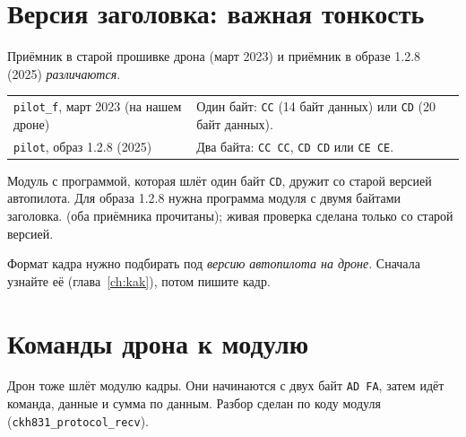 \section{Версия заголовка: важная тонкость}

Приёмник в старой прошивке дрона (март 2023) и приёмник в образе 1.2.8 (2025) \emph{различаются}.

\begin{tabularx}{\textwidth}{@{}l Y@{}}
\toprule
{} &  \\ \midrule
\texttt{pilot\_f}, март 2023 (на нашем дроне) & Один байт: \texttt{CC} (14 байт данных) или \texttt{CD} (20 байт данных). \\
\texttt{pilot}, образ 1.2.8 (2025) & Два байта: \texttt{CC CC}, \texttt{CD CD} или \texttt{CE CE}. \\ \bottomrule
\end{tabularx}

\vspace{4pt}
Модуль с программой, которая шлёт один байт \texttt{CD}, дружит со старой версией автопилота. Для образа 1.2.8 нужна программа модуля с двумя байтами заголовка. \pr{} (оба приёмника прочитаны); живая проверка сделана только со старой версией.

\begin{vnimanie}
Формат кадра нужно подбирать под \emph{версию автопилота на дроне}. Сначала узнайте её (глава~\ref{ch:kak}), потом пишите кадр.
\end{vnimanie}

\section{Команды дрона к модулю}

Дрон тоже шлёт модулю кадры. Они начинаются с двух байт \texttt{AD FA}, затем идёт команда, данные и сумма по данным. Разбор сделан по коду модуля (\texttt{ckh831\_protocol\_recv}).

